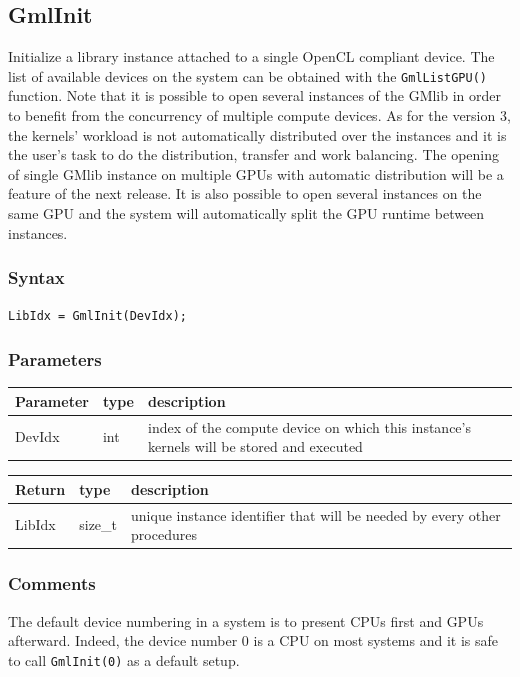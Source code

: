 \documentclass[a4paper,12pt]{article}
\begin{document}
\subsection{GmlInit}
Initialize a library instance attached to a single OpenCL compliant device. The list of available devices on the system can be obtained with the {\tt GmlListGPU()} function. Note that it is possible to open several instances of the GMlib in order to benefit from the concurrency of multiple compute devices. As for the version 3, the kernels' workload is not automatically distributed over the instances and it is the user's task to do the distribution, transfer and work balancing. The opening of single GMlib instance on multiple GPUs with automatic distribution will be a feature of the next release. It is also possible to open several instances on the same GPU and the system will automatically split the GPU runtime between instances.

\subsubsection*{Syntax}
{\tt LibIdx = GmlInit(DevIdx);}

\subsubsection*{Parameters}
\begin{tabular}{|m{2cm}|m{1.5cm}|m{10.5cm}|}
\hline
Parameter  & type   & description \\
\hline
DevIdx     & int    & index of the compute device on which this instance's kernels will be stored and executed \\
\hline
\end{tabular}

\medskip

\begin{tabular}{|m{2cm}|m{1.5cm}|m{10.5cm}|}
\hline
Return     & type    & description \\
\hline
LibIdx     & size\_t & unique instance identifier that will be needed by every other procedures \\
\hline
\end{tabular}

\subsubsection*{Comments}
The default device numbering in a system is to present CPUs first and GPUs afterward. Indeed, the device number 0 is a CPU on most systems and it is safe to call {\tt GmlInit(0)} as a default setup.
\end{document}

